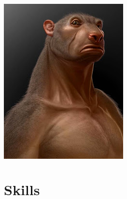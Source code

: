 \documentclass[10pt,twoside]{article}
\begin{document}
\begin{multicols}{2}
  \includegraphics[width=\linewidth]{charlesliu_bearman.jpg}
  
  \end{multicols}
  
  \newpage


  \section{Skills}
  
\end{document}
